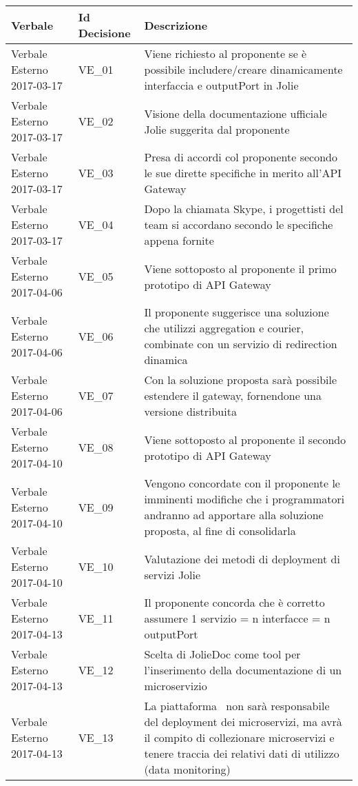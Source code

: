 \begin{table}[H]
	\begin{center}
		\begin{tabular}{|p{5.5cm} |p{2.5cm}| p{7cm}|}
			\hline
			\textbf{Verbale} & \textbf{Id Decisione}	& \textbf{Descrizione} \\
			\hline
			Verbale Esterno 2017-03-17 & VE\_01	& Viene richiesto al proponente se è possibile includere/creare dinamicamente interfaccia e outputPort in Jolie	\\
			\hline
			Verbale Esterno 2017-03-17 & VE\_02 & Visione della documentazione ufficiale Jolie suggerita dal proponente \\
			\hline
			Verbale Esterno 2017-03-17 & VE\_03 & Presa di accordi col proponente secondo le sue dirette specifiche in merito all'API Gateway \\
			\hline
			Verbale Esterno 2017-03-17 & VE\_04 & Dopo la chiamata Skype, i progettisti del team si accordano secondo le specifiche appena fornite \\
			\hline
			Verbale Esterno 2017-04-06 & VE\_05	& Viene sottoposto al proponente il primo prototipo di API Gateway \\
			\hline
			Verbale Esterno 2017-04-06 & VE\_06 &  Il proponente suggerisce una soluzione che utilizzi aggregation e courier, combinate con un servizio di redirection dinamica \\
			\hline
			Verbale Esterno 2017-04-06 & VE\_07 & Con la soluzione proposta sarà possibile estendere il gateway, fornendone una versione distribuita\\
			\hline
			Verbale Esterno 2017-04-10 & VE\_08	& Viene sottoposto al proponente il secondo prototipo di API Gateway \\
			\hline
			Verbale Esterno 2017-04-10 & VE\_09 & Vengono concordate con il proponente le imminenti modifiche che i programmatori andranno ad apportare alla soluzione proposta, al fine di consolidarla \\
			\hline
			Verbale Esterno 2017-04-10 & VE\_10 & Valutazione dei metodi di deployment di servizi Jolie\\
			\hline
			Verbale Esterno 2017-04-13 & VE\_11	&  Il proponente concorda che è corretto assumere 1 servizio = n interfacce = n outputPort \\
			\hline
			Verbale Esterno 2017-04-13 & VE\_12 &  Scelta di JolieDoc come tool per l'inserimento della documentazione di un microservizio \\
			\hline
			Verbale Esterno 2017-04-13 & VE\_13 & La piattaforma \progetto\ non sarà responsabile del deployment dei microservizi, ma avrà il compito di collezionare microservizi e tenere traccia dei relativi dati di utilizzo (data monitoring) \\

\end{tabular}
\end{center}
\end{table}
